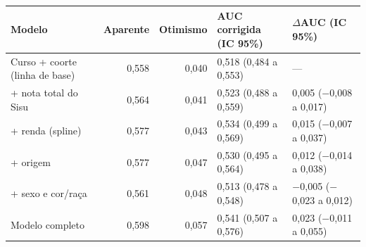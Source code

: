 \begin{tabular}{lrrll}
\toprule
Modelo & Aparente & Otimismo & \makecell[l]{AUC corrigida\\(IC 95\%)} & \makecell[l]{$\Delta$AUC\\(IC 95\%)} \\
\midrule
Curso + coorte (linha de base) & 0,558 & 0,040 & 0,518 (0,484 a 0,553) & --- \\
+ nota total do Sisu & 0,564 & 0,041 & 0,523 (0,488 a 0,559) & 0,005 ($-$0,008 a 0,017) \\
+ renda (spline) & 0,577 & 0,043 & 0,534 (0,499 a 0,569) & 0,015 ($-$0,007 a 0,037) \\
+ origem & 0,577 & 0,047 & 0,530 (0,495 a 0,564) & 0,012 ($-$0,014 a 0,038) \\
+ sexo e cor/raça & 0,561 & 0,048 & 0,513 (0,478 a 0,548) & $-$0,005 ($-$0,023 a 0,012) \\
Modelo completo & 0,598 & 0,057 & 0,541 (0,507 a 0,576) & 0,023 ($-$0,011 a 0,055) \\
\bottomrule
\end{tabular}
